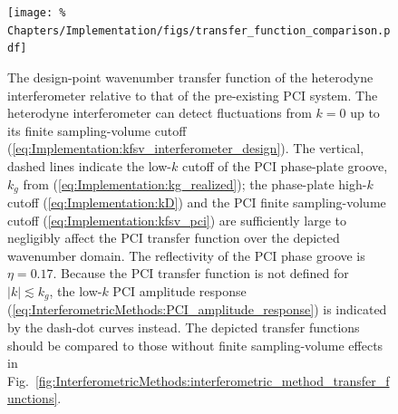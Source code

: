 \begin{figure}
  \centering
  \texttt{[image: \%
    Chapters/Implementation/figs/transfer\_function\_comparison.pdf]}
  \caption[Design-point wavenumber transfer functions of combined PCI-interferometer]{%
    The design-point wavenumber transfer function
    of the heterodyne interferometer relative to
    that of the pre-existing PCI system.
    The heterodyne interferometer can detect fluctuations from
    $k = 0$ up to its finite sampling-volume cutoff
    (\ref{eq:Implementation:kfsv_interferometer_design}).
    The vertical, dashed lines indicate
    the low-$k$ cutoff of the PCI phase-plate groove,
    $k_g$ from (\ref{eq:Implementation:kg_realized});
    the phase-plate high-$k$ cutoff (\ref{eq:Implementation:kD}) and
    the PCI finite sampling-volume cutoff (\ref{eq:Implementation:kfsv_pci})
    are sufficiently large to negligibly affect the PCI transfer function
    over the depicted wavenumber domain.
    The reflectivity of the PCI phase groove is $\eta = 0.17$.
    Because the PCI transfer function is not defined for $|k| \lesssim k_g$,
    the low-$k$ PCI amplitude response
    (\ref{eq:InterferometricMethods:PCI_amplitude_response})
    is indicated by the dash-dot curves instead.
    The depicted transfer functions should be compared
    to those without finite sampling-volume effects in
    Fig.~\ref{fig:InterferometricMethods:interferometric_method_transfer_functions}.
  }
\label{fig:Implementation:transfer_function_comparison}
\end{figure}


